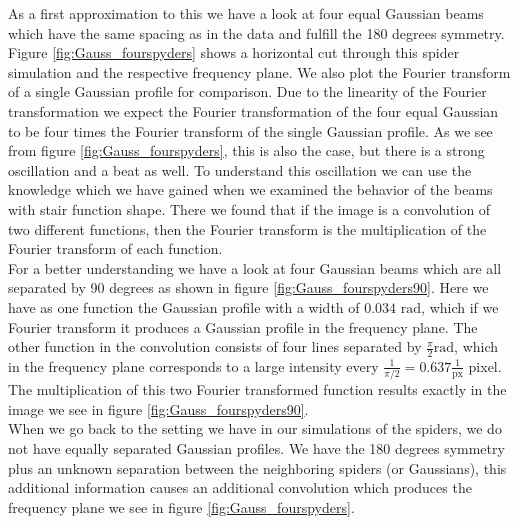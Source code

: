 As a first approximation to this we have a look at four equal Gaussian beams which have the same spacing as in the data and fulfill the 180 degrees symmetry. Figure \ref{fig:Gauss_fourspyders} shows a horizontal cut through this spider simulation and the respective frequency plane. We also plot the Fourier transform of a single Gaussian profile for comparison. Due to the linearity of the Fourier transformation we expect the Fourier transformation of the four equal Gaussian to be four times the Fourier transform of the single Gaussian profile. As we see from figure \ref{fig:Gauss_fourspyders}, this is also the case, but there is a strong oscillation and a beat as well. To understand this oscillation we can use the knowledge which we have gained when we examined the behavior of the beams with stair function shape. There we found that if the image is a convolution of two different functions, then the Fourier transform is the multiplication of the Fourier transform of each function. \\
For a better understanding we have a look at four Gaussian beams which are all separated by 90 degrees as shown in figure \ref{fig:Gauss_fourspyders90}. Here we have as one function the Gaussian profile with a width of $0.034$ $\mathrm{rad}$,  which if we Fourier transform it produces a Gaussian profile in the frequency plane. The other function in the convolution consists of four lines separated by $\frac{\pi}{2} \mathrm{rad}$, which in the frequency plane corresponds to a large intensity every $\frac{1}{\pi/2} = 0.637 \frac{1}{\mathrm{px}}$ pixel. The multiplication of this two Fourier transformed function results exactly in the image we see in figure \ref{fig:Gauss_fourspyders90}. \\
When we go back to the setting we have in our simulations of the spiders, we do not have equally separated Gaussian profiles. We have the 180 degrees symmetry plus an unknown separation between the neighboring spiders (or Gaussians), this additional information causes an additional convolution which produces the frequency plane we see in figure \ref{fig:Gauss_fourspyders}. 
